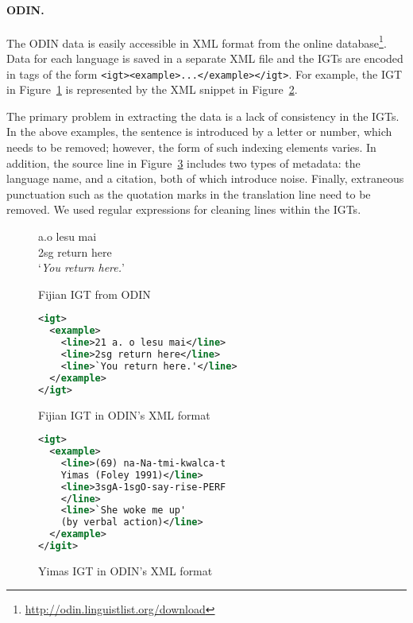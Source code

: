 \paragraph{ODIN.}
The ODIN data is easily accessible in XML format from the online database\footnote{\url{http://odin.linguistlist.org/download}}. Data for each language is saved in a separate XML file and the IGTs are encoded in tags of the form \texttt{<igt><example>...</example></igt>}.  For example, the IGT in Figure~\ref{fig:odin_fijian} is represented by the XML snippet in Figure~\ref{fig:odin_fijian_xml}.

The primary problem in extracting the data is a lack of consistency in the IGTs. In the above examples, the sentence is introduced by a letter or number, which needs to be removed; however, the form of such indexing elements varies. In addition, the source line in Figure~\ref{fig:odin_yimas_xml} includes two types of metadata: the language name, and a citation, both of which introduce noise.  Finally, extraneous punctuation such as the quotation marks in the translation line need to be removed. We used regular expressions for cleaning lines within the IGTs.

\begin{figure}[t]
 a.\quad o lesu mai \\
\indent \qquad\qquad 2sg return here \\
\indent \qquad\qquad `\emph{You return here.}' \\
\caption{Fijian IGT from ODIN} \label{fig:odin_fijian}
\end{figure}


\begin{figure}[t]
\small
\begin{lstlisting}[language=XML]
<igt>
  <example>
    <line>21 a. o lesu mai</line>
    <line>2sg return here</line>
    <line>`You return here.'</line>
  </example>
</igt>
\end{lstlisting} 
\caption{Fijian IGT in ODIN's XML format} \label{fig:odin_fijian_xml}
\end{figure}


\begin{figure}[t]
\small
\begin{lstlisting}[language=XML]
<igt>
  <example>
    <line>(69) na-Na-tmi-kwalca-t 
    Yimas (Foley 1991)</line>
    <line>3sgA-1sgO-say-rise-PERF
    </line>
    <line>`She woke me up' 
    (by verbal action)</line>
  </example>
</igit>
\end{lstlisting} 
\smallskip
\caption{Yimas IGT in ODIN's XML format}\label{fig:odin_yimas_xml}
\end{figure}



